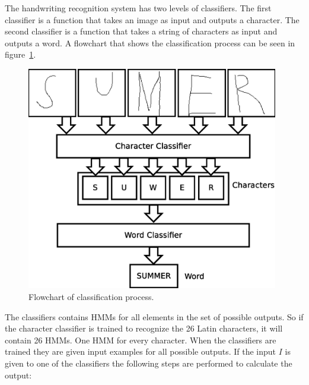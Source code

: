 
The handwriting recognition system has two levels of classifiers. 
The first classifier is a function that takes an image as input and outputs a character. 
The second classifier is a function that takes a string of characters as input and outputs a word. 
A flowchart that shows the classification process can be seen in figure~\ref{fig:classification_system_overview}. 

    \begin{figure}[htb] 
      \begin{center}
	\leavevmode
	\includegraphics[width=110mm]{classification_system_overview.eps}%
      \end{center}
      \caption{Flowchart of classification process.}
      \label{fig:classification_system_overview}
    \end{figure}

The classifiers contains HMMs for all elements in the set of possible outputs. 
So if the character classifier is trained to recognize the 26 Latin characters, it will contain 26 HMMs. 
One HMM for every character. 
When the classifiers are trained they are given input examples for all possible outputs. 
If the input $I$ is given to one of the classifiers the following steps are performed to calculate the output:

